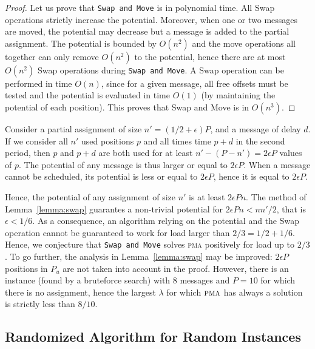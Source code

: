 \documentclass[a4paper,UKenglish,cleveref, autoref, thm-restate]{lipics-v2019}
\newcommand\pma{\textsc{pma}\xspace}
\newcommand\swapandmove{\texttt{Swap and Move}\xspace}
\begin{document}
\begin{proof}
Let us prove that \swapandmove is in polynomial time. All Swap operations 
strictly increase the potential. Moreover, when one or two messages are moved, the potential may decrease but
a message is added to the partial assignment. The potential is bounded by $O(n^2)$ and the move operations all together can only remove $O(n^2)$ to the potential, hence there are at most $O(n^2)$ Swap operations during \swapandmove. A Swap operation can be performed in time $O(n)$, since for a given message, all free offsets must be tested and the potential is evaluated in time $O(1)$ (by maintaining the potential of each position). This proves that Swap and Move is in $O(n^3)$.  
\end{proof}

Consider a partial assignment of size $n' = (1/2 + \epsilon)P$, and a message of delay $d$.
If we consider all $n'$ used positions $p$ and all times time $p+d$ in the second period, 
then $p$ and $p+d$ are both used for at least $n' - (P -n') = 2\epsilon P$ values of $p$.
The potential of any message is thus larger or equal to $2\epsilon P$. When a message cannot be scheduled, its potential is less or equal to $2\epsilon P$, hence it is equal to $2\epsilon P$.

Hence, the potential of any assignment of size $n'$ is at least $2\epsilon P n $. The method of Lemma~\ref{lemma:swap} guarantes a non-trivial potential for $2\epsilon P n <  nn'/2$, that is $\epsilon < 1/6$. As a consequence, an algorithm relying on the potential and the Swap operation cannot be guaranteed to work for load larger than $2/3 = 1/2 + 1/6$. Hence, we conjecture that \swapandmove solves \pma positively for load up to $2/3$. To go further, the analysis in Lemma~\ref{lemma:swap} may be improved: $2\epsilon P$ positions in $P_{u}$ are not taken into account in the proof. However, there is an instance (found by a bruteforce search) with $8$ messages and $P=10$ for which there is no assignment, hence the largest $\lambda$ for which $\pma$ has always a solution is strictly less than $8/10$. 


\subsection{Randomized Algorithm for Random Instances}
\end{document}
